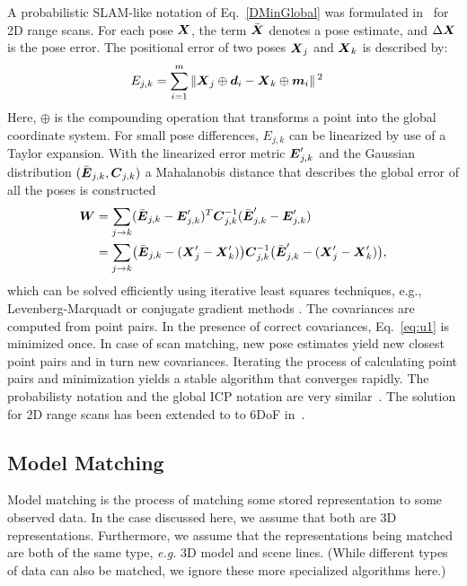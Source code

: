 \documentclass[twocolumn,oneside]{book}
\newcommand{\V}[1]{\vector{#1}}  %
\newcommand{\M}[1]{\V{#1}}    %
\begin{document}
A probabilistic SLAM-like notation of Eq.~\eqref{DMinGlobal} was
formulated in~\cite{lu97} for 2D range scans. For each pose ${\V X}$,
the term $\bar{\V X}$ denotes a pose estimate, and $\Delta {\V X}$ is
the pose error. The positional error of two poses ${\V X}_j$ and
${\V X}_k$ is described by:
\begin{align*}
E_{j,k} &= \sum^m_{i=1} \norm{ {\V X}_j \oplus {\V d}_i - {\V X}_k \oplus
{\V m}_i }^2 
\end{align*}
Here, $\oplus$ is the compounding operation that transforms a point
into the global coordinate system.  For small pose differences,
$E_{j,k}$ can be linearized by use of a Taylor expansion. With the
linearized error metric ${\V E}'_{j,k}$ and the Gaussian distribution
$(\bar{\V E}_{j,k}, {\M C}_{j,k})$ a Mahalanobis distance that
describes the global error of all the poses is constructed
\begin{align}
{\M W} &= \sum_{j \rightarrow k} (\bar{\V E}_{j,k} - {\V E}'_{j,k})^{T} {\M C}^{-1}_{j,k}
(\bar{\V E}'_{j,k} - {\V E}'_{j,k}) \nonumber \\
&=  \sum_{j \rightarrow k}
\bigl(\bar{\V E}_{j,k} - ({\V X}'_j - {\V X}'_k)\bigr)
{\M C}^{-1}_{j,k} \bigl(\bar{\V E}'_{j,k} - ({\V X}'_j - {\V X}'_k)\bigr),\label{eq:u1}
\end{align}
which can be solved efficiently using iterative least squares
techniques, e.g., Levenberg-Marquadt or conjugate gradient methods
\cite{konolige04,kelly03}.  The covariances are computed from point
pairs. In the presence of correct covariances, Eq.~\eqref{eq:u1} is
minimized once. In case of scan matching, new pose estimates yield new
closest point pairs and in turn new covariances. Iterating the process
of calculating point pairs and minimization yields a stable algorithm
that converges rapidly. The probabilisty notation and the global ICP
notation are very similar~\cite{CVIU2010}. The solution for 2D range
scans has been extended to to 6DoF in~\cite{RAS2007}.

\subsection{Model Matching}

Model matching is the process of matching some stored representation
to some observed data. In the case discussed here, we assume that both
are 3D representations.  Furthermore, we assume that the
representations being matched are both of the same type, {\it e.g.} 3D
model and scene lines. (While different types of data can also be
matched, we ignore these more specialized algorithms here.)
\end{document}

